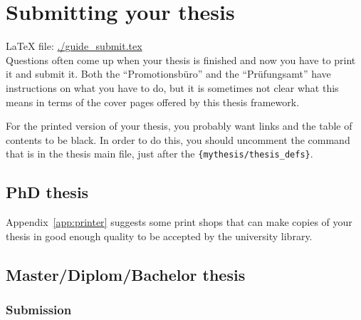 \chapter{Submitting your thesis}
\label{sec:submit}

\LaTeX{} file: \url{./guide_submit.tex}\\[1ex]
\noindent
Questions often come up when your thesis is finished and now you have
to print it and submit it. Both the
\foreignquote{ngerman}{Promotionsbüro} and the
\foreignquote{ngerman}{Prüfungsamt} have instructions on what you have
to do, but it is sometimes not clear what this means in terms of the
cover pages offered by this thesis framework.

For the printed version of your thesis, you probably want
 links and the table of contents to be black. In
order to do this, you should uncomment the  command
that is in the thesis main file, just after the
\texttt{\{mythesis/thesis\_defs\}}.


\section{PhD thesis}
\label{sec:submit:phd}



Appendix~\ref{app:printer} suggests some print shops that can make copies
of your thesis in good enough quality to be accepted by the university
library.


\section{Master/Diplom/Bachelor thesis}
\label{sec:submit:other}

\subsection{Submission}

